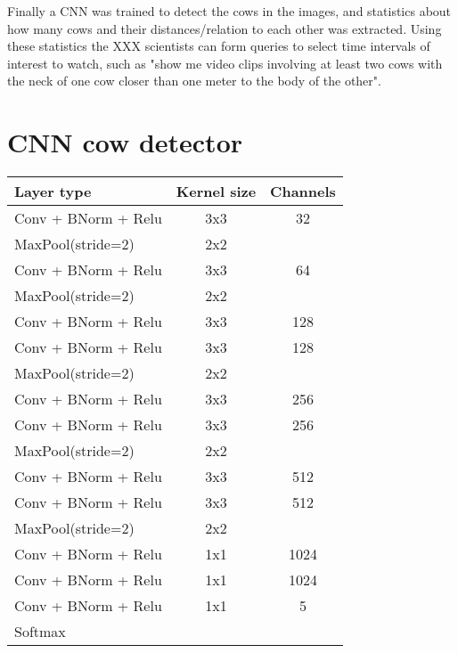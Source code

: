 \documentclass[10pt,a4paper,twocolumn]{article}
\begin{document}
Finally a CNN was trained to detect the cows in the images, and statistics about how many cows and their distances/relation to each other was extracted. Using these statistics the XXX scientists can form queries to select time intervals of interest to watch, such as "show me video clips involving at least two cows with the neck of one cow closer than one meter to the body of the other".

\section{CNN cow detector}
\begin{tabular}{|l|c|c|}
\hline 
\textbf{Layer type} & \textbf{Kernel size} & \textbf{Channels} \\ 
\hline 

Conv + BNorm + Relu & 3x3 & 32 \\ 
MaxPool(stride=2) & 2x2 &  \\ 
\hline 

Conv + BNorm + Relu & 3x3 & 64 \\ 
MaxPool(stride=2) & 2x2 &  \\ 
\hline 

Conv + BNorm + Relu & 3x3 & 128 \\ 
Conv + BNorm + Relu & 3x3 & 128 \\ 
MaxPool(stride=2) & 2x2 &  \\ 
\hline 

Conv + BNorm + Relu & 3x3 & 256 \\ 
Conv + BNorm + Relu & 3x3 & 256 \\ 
MaxPool(stride=2) & 2x2 &  \\ 
\hline 

Conv + BNorm + Relu & 3x3 & 512 \\ 
Conv + BNorm + Relu & 3x3 & 512 \\ 
MaxPool(stride=2) & 2x2 &  \\ 
\hline 

Conv + BNorm + Relu & 1x1 & 1024 \\ 
Conv + BNorm + Relu & 1x1 & 1024 \\ 
Conv + BNorm + Relu & 1x1 & 5 \\ 
Softmax & & \\
\hline 

\end{tabular} 
\end{document}
